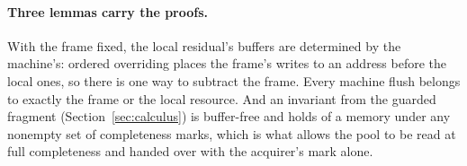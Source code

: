 \paragraph{Three lemmas carry the proofs.}
With the frame fixed, the local residual's buffers are determined by the
machine's: ordered overriding places the frame's writes to an address
before the local ones, so there is one way to subtract the frame. Every machine flush belongs to exactly
the frame or the local resource. And an invariant from the guarded
fragment (Section~\ref{sec:calculus}) is buffer-free and holds of a memory
under any nonempty set of completeness marks, which is what allows the pool to be
read at full completeness and handed over with the acquirer's mark alone.
